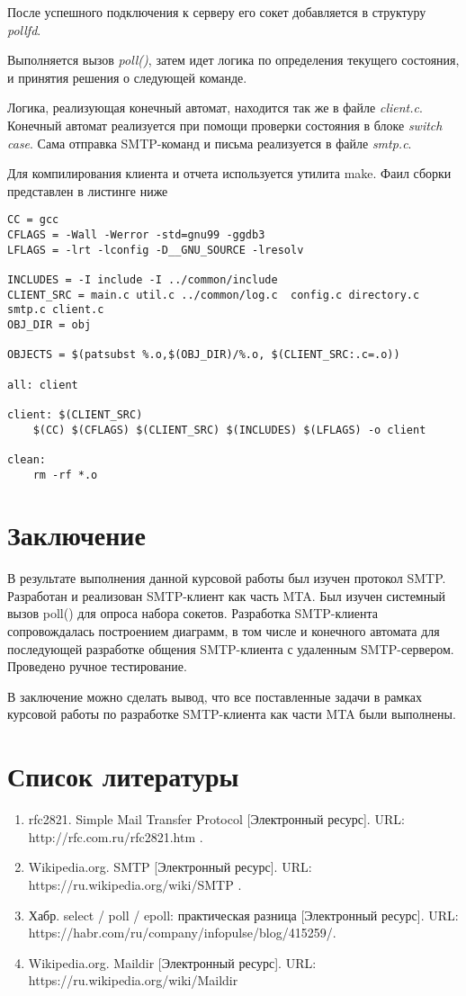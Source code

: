 \documentclass[a4paper,12pt]{report}
\begin{document}
	После успешного подключения к серверу его сокет добавляется в структуру \textit{pollfd}.
	
	Выполняется вызов \textit{poll()}, затем идет логика по определения текущего состояния, и принятия решения о следующей команде.

	Логика, реализующая конечный автомат,
	 находится так же в файле \textit{client.c}. 
	  Конечный автомат реализуется при помощи проверки состояния в блоке \textit{switch case}. 
	  Сама отправка SMTP-команд и письма реализуется в файле \textit{smtp.c}.

	  Для компилирования клиента и отчета используется утилита make. 
	  Фаил сборки представлен в листинге ниже
	  \begin{Verbatim}
CC = gcc
CFLAGS = -Wall -Werror -std=gnu99 -ggdb3
LFLAGS = -lrt -lconfig -D__GNU_SOURCE -lresolv

INCLUDES = -I include -I ../common/include 
CLIENT_SRC = main.c util.c ../common/log.c  config.c directory.c smtp.c client.c
OBJ_DIR = obj

OBJECTS = $(patsubst %.o,$(OBJ_DIR)/%.o, $(CLIENT_SRC:.c=.o))

all: client

client: $(CLIENT_SRC)
	$(CC) $(CFLAGS) $(CLIENT_SRC) $(INCLUDES) $(LFLAGS) -o client

clean:
	rm -rf *.o

	  \end{Verbatim}

	\chapter{Заключение}

	В результате выполнения данной курсовой работы был изучен протокол SMTP. 
	Разработан и реализован SMTP-клиент как часть MTA. 
	Был изучен системный вызов poll() для опроса набора сокетов. 
	 Разработка SMTP-клиента сопровождалась построением диаграмм,
	  в том числе и конечного автомата для последующей разработке 
	  общения SMTP-клиента с удаленным SMTP-сервером. 
	  Проведено ручное тестирование.
	
	В заключение можно сделать вывод, что все поставленные задачи в рамках курсовой работы по 
	разработке SMTP-клиента как части MTA были выполнены.


	\chapter{Список литературы}

	\begin{enumerate}
		\item rfc2821. Simple Mail Transfer Protocol [Электронный ресурс]. URL: http://rfc.com.ru/rfc2821.htm .
		\item Wikipedia.org. SMTP [Электронный ресурс]. URL: https://ru.wikipedia.org/wiki/SMTP .
		\item Хабр. select / poll / epoll: практическая разница [Электронный ресурс]. URL: https://habr.com/ru/company/infopulse/blog/415259/.
		\item Wikipedia.org. Maildir [Электронный ресурс]. URL: https://ru.wikipedia.org/wiki/Maildir
	\end{enumerate}
	
\end{document}
